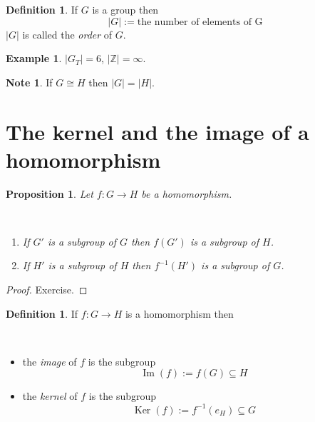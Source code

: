 \documentclass[12pt, letterpaper, oneside]{article}
\theoremstyle{plain}
\newtheorem{proposition}[theorem]{Proposition}
\theoremstyle{definition}
\newtheorem{definition}[theorem]{Definition}
\newtheorem{example}[theorem]{Example}
\newtheorem{note}[theorem]{Note}
\newcommand{\Z}{{\mathbb Z}}
\renewcommand{\Im}{\operatorname{Im}}
\newcommand{\Ker}{\operatorname{Ker}}
\newcommand{\benu}{\begin{enumerate}}
\newcommand{\eenu}{\end{enumerate}}
\newcommand{\bit}{\begin{itemize}}
\newcommand{\eit}{\end{itemize}}
\newcommand{\vs}{\vskip 5mm}
\newcommand{\isep}[1][0]{\setlength{\itemsep}{#1 mm}}
\begin{document}
\vs


\begin{definition}
If $G$ is a group then 
$$|G| := \text{the number of elements of G}$$
$|G|$ is called the \emph{order} of $G$.
\end{definition}


\vs 

\begin{example}
$|G_{T}| = 6$, $|\Z| = \infty$.
\end{example}

\vs

\begin{note}
If $G\cong H$ then $|G| = |H|$.
\end{note}






\newpage
\section{The kernel and  the image of a homomorphism}
\label{SEC_KERIM}


\begin{proposition}
Let $f\colon G\to H$ be a homomorphism.

\vskip -13mm

\ 
\benu
\isep
\item If $G'$ is a subgroup of $G$ then $f(G')$ is a subgroup of $H$.
\item If $H'$ is a subgroup of $H$ then $f^{-1}(H')$ is a subgroup of $G$.
\eenu
\end{proposition}


\begin{proof}
Exercise.
\end{proof}

\vs


\begin{definition}
If $f\colon G\to H$ is a homomorphism then 

\vskip -13mm

\ 
\bit
\isep
\item the \emph{image} of $f$ is the subgroup 
$$\Im(f) := f(G) \subseteq H$$ 
\item the \emph{kernel} of $f$ is the subgroup 
$$\Ker(f) := f^{-1}(e_{H})\subseteq G$$
\eit
\end{definition}


\vs
\end{document}
